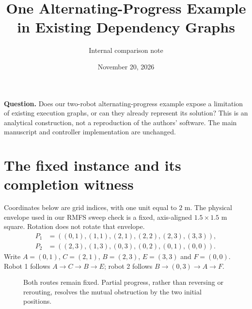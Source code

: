 \documentclass[11pt,a4paper]{article}
\title{One Alternating-Progress Example in Existing Dependency Graphs}
\author{Internal comparison note}
\date{November 20, 2026}
\begin{document}
\maketitle
\noindent\textbf{Question.} Does our two-robot alternating-progress example expose a
limitation of existing execution graphs, or can they already represent its solution?
This is an analytical construction, not a reproduction of the authors' software.
The main manuscript and controller implementation are unchanged.

\section{The fixed instance and its completion witness}
Coordinates below are grid indices, with one unit equal to $2$ m. The physical
envelope used in our RMFS sweep check is a fixed, axis-aligned $1.5\times1.5$ m
square. Rotation does not rotate that envelope.
\begin{align}
P_1&=((0,1),(1,1),(2,1),(2,2),(2,3),(3,3)),\\
P_2&=((2,3),(1,3),(0,3),(0,2),(0,1),(0,0)).
\end{align}
Write $A=(0,1)$, $C=(2,1)$, $B=(2,3)$, $E=(3,3)$ and $F=(0,0)$.
Robot 1 follows $A\to C\to B\to E$; robot 2 follows $B\to(0,3)\to A\to F$.

\begin{figure}[h]
\centering
{}
\caption{Both routes remain fixed. Partial progress, rather than reversing or
rerouting, resolves the mutual obstruction by the two initial positions.}
\end{figure}
\end{document}

